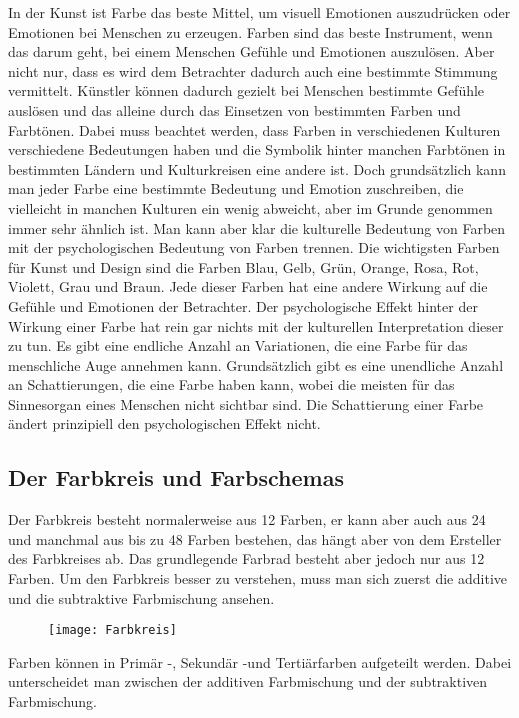 In der Kunst ist Farbe das beste Mittel, um visuell Emotionen auszudrücken oder Emotionen bei Menschen zu erzeugen. Farben sind das beste Instrument, wenn das darum geht, bei einem Menschen Gefühle und Emotionen auszulösen. Aber nicht nur, dass es wird dem Betrachter dadurch auch eine bestimmte Stimmung vermittelt. Künstler können dadurch gezielt bei Menschen bestimmte Gefühle auslösen und das alleine durch das Einsetzen von bestimmten Farben und Farbtönen.
Dabei muss beachtet werden, dass Farben in verschiedenen Kulturen verschiedene Bedeutungen haben und die Symbolik hinter manchen Farbtönen in bestimmten Ländern und Kulturkreisen eine andere ist. Doch grundsätzlich kann man jeder Farbe eine bestimmte Bedeutung und Emotion zuschreiben, die vielleicht in manchen Kulturen ein wenig abweicht, aber im Grunde genommen immer sehr ähnlich ist.
Man kann aber klar die kulturelle Bedeutung von Farben mit der psychologischen Bedeutung von Farben trennen. Die wichtigsten Farben für Kunst und Design sind die Farben Blau, Gelb, Grün, Orange, Rosa, Rot, Violett, Grau und Braun. Jede dieser Farben hat eine andere Wirkung auf die Gefühle und Emotionen der Betrachter. Der psychologische Effekt hinter der Wirkung einer Farbe hat rein gar nichts mit der kulturellen Interpretation dieser zu tun. 
Es gibt eine endliche Anzahl an Variationen, die eine Farbe für das menschliche Auge annehmen kann. Grundsätzlich gibt es eine unendliche Anzahl an Schattierungen, die eine Farbe haben kann, wobei die meisten für das Sinnesorgan eines Menschen nicht sichtbar sind. Die Schattierung einer Farbe ändert prinzipiell den psychologischen Effekt nicht.
\cite{mollica2018special}

\subsection{Der Farbkreis und Farbschemas}
Der Farbkreis besteht normalerweise aus 12 Farben, er kann aber auch aus 24 und manchmal aus bis zu 48 Farben bestehen, das hängt aber von dem Ersteller des Farbkreises ab. Das grundlegende Farbrad besteht aber jedoch nur aus 12 Farben. Um den Farbkreis besser zu verstehen, muss man sich zuerst die additive und die subtraktive Farbmischung ansehen.  
\cite{mollica2018special}

\begin{figure}[H]
	\centering
	\texttt{[image: Farbkreis]}
	\caption{\cite{_basicColorTheory}}
\end{figure}

Farben können in Primär -, Sekundär -und Tertiärfarben aufgeteilt werden. Dabei unterscheidet man zwischen der additiven Farbmischung und der subtraktiven Farbmischung. 

